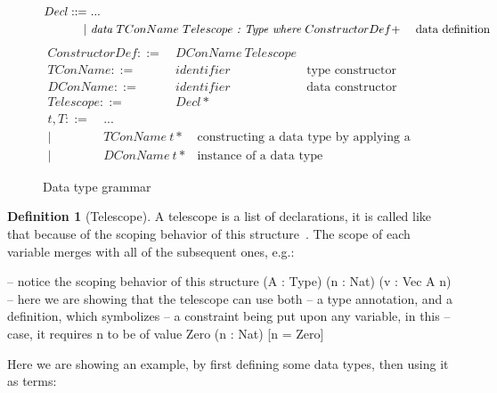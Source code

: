 \documentclass[12pt]{article}
\theoremstyle{definition}
\newtheorem{definition}{Definition}[section]
\begin{document}
\begin{figure}[H]
       \[
              \begin{aligned}
                     Decl ::= & \ ... \\
                     |        & \ \emph{data}\ TConName\ Telescope\ \emph{:\ Type\ where}\ ConstructorDef+ & \ \text{data definition}
              \end{aligned}
       \]
       \[
              \begin{aligned}
                     ConstructorDef ::= & \  DConName\ Telescope \\
                     TConName       ::= & \ identifier & \text{type constructor name} \\
                     DConName       ::= & \ identifier & \text{data constructor name} \\
                     Telescope      ::= & \ Decl*
              \end{aligned}
       \]
       \[
              \begin{aligned}
                     t, T ::= & \ ... \\
                     |        & \ TConName\ t* & \text{constructing a data type by applying a list of arguments}     \\
                     |        & \ DConName\ t* & \text{instance of a data type}
              \end{aligned}
       \]
       \caption{Data type grammar}
\end{figure}


\begin{definition}[Telescope]
       A telescope is a list of declarations, it is called like that because of the scoping behavior of this structure~\cite{oplss}.
       The scope of each variable merges with all of the subsequent ones, e.g.:
       \begin{piforall}
              -- notice the scoping behavior of this structure
              (A : Type) (n : Nat) (v : Vec A n)
              -- here we are showing that the telescope can use both
              -- a type annotation, and a definition, which symbolizes
              -- a constraint being put upon any variable, in this
              -- case, it requires n to be of value Zero
              (n : Nat) [n = Zero]
       \end{piforall}
\end{definition}

Here we are showing an example, by first defining some data types, then using it as terms:
\end{document}
